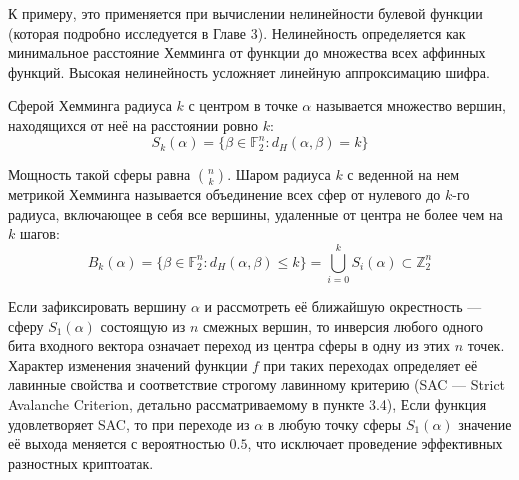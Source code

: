 \documentclass[14pt, a4paper]{extarticle}
\begin{document}
К примеру, это применяется при вычислении нелинейности булевой функции (которая подробно исследуется в Главе 3).
Нелинейность определяется как минимальное расстояние Хемминга от функции до множества всех аффинных функций.
Высокая нелинейность усложняет линейную аппроксимацию шифра.

\vspace{2em}
\vspace{1em}

Сферой Хемминга радиуса $k$ с центром в точке $\alpha$ называется множество вершин, находящихся от неё на расстоянии ровно $k$:
\begin{equation*}
S_k(\alpha) = \{\beta \in \mathbb{F}_2^n : d_H(\alpha, \beta) = k\}
\end{equation*}

Мощность такой сферы равна $\binom{n}{k}$.
Шаром радиуса $k$ с веденной на нем метрикой Хемминга называется объединение всех сфер от нулевого до $k$-го радиуса,
включающее в себя все вершины, удаленные от центра не более чем на $k$ шагов:
\begin{equation*}
B_k(\alpha) = \{\beta \in \mathbb{F}_2^n : d_H(\alpha, \beta) \le k\} = \bigcup_{i=0}^{k} S_i(\alpha) \subset \mathbb{Z}_2^n
\end{equation*}

Если зафиксировать вершину $\alpha$ и рассмотреть её ближайшую окрестность — сферу $S_1(\alpha)$ 
состоящую из $n$ смежных вершин,
то инверсия любого одного бита входного вектора означает переход из центра сферы в одну из этих $n$ точек.
Характер изменения значений функции $f$ при таких переходах определяет её лавинные свойства
и соответствие строгому лавинному критерию (SAC — Strict Avalanche Criterion, детально рассматриваемому в пункте 3.4),
Если функция удовлетворяет SAC, то при переходе из $\alpha$ в любую точку сферы $S_1(\alpha)$
значение её выхода меняется с вероятностью $0.5$, что исключает проведение эффективных разностных криптоатак.
\end{document}
